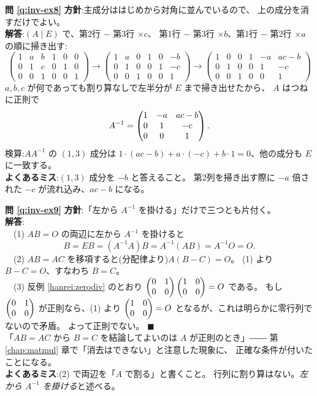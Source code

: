 \bigskip
\noindent\textbf{問 \ref{q:inv-ex8}}\quad
\textbf{方針}:主成分ははじめから対角に並んでいるので、
上の成分を消すだけでよい。\\
\textbf{解答}:$(A \mid E)$ で、第2行 $-$ 第3行 $\times c$、
第1行 $-$ 第3行 $\times b$、第1行 $-$ 第2行 $\times a$ の順に掃き出す:
\[
\left(\begin{array}{ccc|ccc}
1 & a & b & 1 & 0 & 0 \\
0 & 1 & c & 0 & 1 & 0 \\
0 & 0 & 1 & 0 & 0 & 1
\end{array}\right)
\longrightarrow
\left(\begin{array}{ccc|ccc}
1 & a & 0 & 1 & 0 & -b \\
0 & 1 & 0 & 0 & 1 & -c \\
0 & 0 & 1 & 0 & 0 & 1
\end{array}\right)
\longrightarrow
\left(\begin{array}{ccc|ccc}
1 & 0 & 0 & 1 & -a & ac - b \\
0 & 1 & 0 & 0 & 1 & -c \\
0 & 0 & 1 & 0 & 0 & 1
\end{array}\right)
\]
$a, b, c$ が何であっても割り算なしで左半分が $E$ まで掃き出せたから、
$A$ はつねに正則で
\[
A^{-1} = \begin{pmatrix}1 & -a & ac - b \\ 0 & 1 & -c \\ 0 & 0 & 1\end{pmatrix}.
\]
検算:$AA^{-1}$ の $(1,3)$ 成分は
$1 \cdot (ac - b) + a \cdot (-c) + b \cdot 1 = 0$、他の成分も $E$ に一致する。\\
\textbf{よくあるミス}:$(1,3)$ 成分を $-b$ と答えること。
第2列を掃き出す際に $-a$ 倍された $-c$ が流れ込み、$ac - b$ になる。

\bigskip
\noindent\textbf{問 \ref{q:inv-ex9}}\quad
\textbf{方針}:「左から $A^{-1}$ を掛ける」だけで三つとも片付く。\\
\textbf{解答}:\\
　(1) $AB = O$ の両辺に左から $A^{-1}$ を掛けると
\[
B = EB = (A^{-1}A)B = A^{-1}(AB) = A^{-1}O = O.
\]
　(2) $AB = AC$ を移項すると(分配律より)$A(B - C) = O$。
(1) より $B - C = O$、すなわち $B = C$。\\
　(3) 反例 \ref{hanrei:zerodiv} のとおり
$\begin{pmatrix}0 & 1 \\ 0 & 0\end{pmatrix}\begin{pmatrix}1 & 0 \\ 0 & 0\end{pmatrix} = O$ である。
もし $\begin{pmatrix}0 & 1 \\ 0 & 0\end{pmatrix}$ が正則なら、(1) より
$\begin{pmatrix}1 & 0 \\ 0 & 0\end{pmatrix} = O$ となるが、これは明らかに零行列でないので矛盾。
よって正則でない。 $\blacksquare$\\
「$AB = AC$ から $B = C$ を結論してよいのは $A$ が正則のとき」――
第 \ref{chap:matmul} 章で「消去はできない」と注意した現象に、
正確な条件が付いたことになる。\\
\textbf{よくあるミス}:(2) で両辺を「$A$ で割る」と書くこと。
行列に割り算はない。\emph{左から $A^{-1}$ を掛ける}と述べる。

